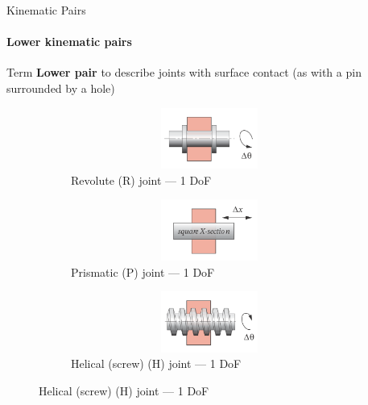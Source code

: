 \documentclass[aspectratio=169]{beamer}
\begin{document}
\begin{frame}[t]{Kinematic Pairs}
    \framesubtitle{Lower kinematic pairs}
    \vspace{-0.3cm}
    Term \textbf{Lower pair} to describe joints with surface contact (as
    with a pin surrounded by a hole)
    \vspace{-0.3cm}

    \begin{figure}[H]
        \begin{subfigure}{0.32\textwidth}
            \centering\includegraphics[height=2cm,width=1\textwidth,keepaspectratio]{R_joint.png}
            \caption{Revolute (R) joint --- 1 DoF}
            \label{fig:R_joint.png}
        \end{subfigure}
        \begin{subfigure}{0.32\textwidth}
            \centering\includegraphics[height=2cm,width=1\textwidth,keepaspectratio]{P_joint.png}
            \caption{Prismatic (P) joint --- 1 DoF}
            \label{fig:P_joint.png}
        \end{subfigure}
        \begin{subfigure}{0.32\textwidth}
            \centering\includegraphics[height=2cm,width=1\textwidth,keepaspectratio]{H_joint.png}
            \caption{Helical (screw) (H) joint --- 1 DoF}
            \label{fig:H_joint.png}
        \end{subfigure}


\end{figure}
\end{frame}
\end{document}
